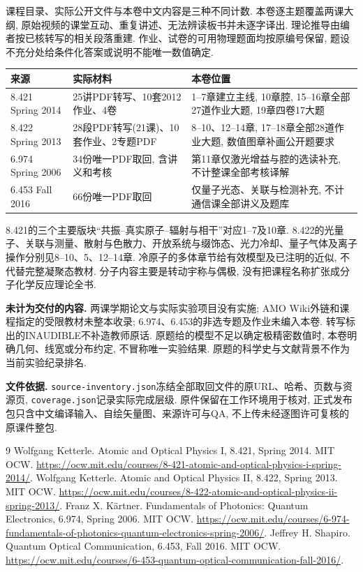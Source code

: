 课程目录、实际公开文件与本卷中文内容是三种不同计数. 本卷逐主题覆盖两课大纲, 原始视频的课堂互动、重复讲述、无法辨读板书并未逐字译出. 理论推导由编者按已核转写的相关段落重建. 作业、试卷的可用物理题面均按原编号保留, 题设不充分处给条件化答案或说明不能唯一数值确定.

\begin{longtable}{p{.22\linewidth}p{.24\linewidth}p{.44\linewidth}}
\toprule 来源 & 实际材料 & 本卷位置\\\midrule\endhead
8.421 Spring 2014 & 25讲PDF转写、10套2012作业、4卷 & 1--7章建立主线, 10章腔, 15--16章全部27道作业大题, 19章四卷17大题\\
8.422 Spring 2013 & 28段PDF转写(21课)、10套作业、2专题PDF & 8--10、12--14章, 17--18章全部28道作业大题, 数值图章补画公开题要求\\
6.974 Spring 2006 & 34份唯一PDF取回, 含讲义和考核 & 第11章仅激光增益与腔的选读补充, 不计整课全部考核译解\\
6.453 Fall 2016 & 66份唯一PDF取回 & 仅量子光态、关联与检测补充, 不计通信课全部讲义及题库\\\bottomrule
\end{longtable}

8.421的三个主要版块“共振--真实原子--辐射与相干”对应1--7及10章. 8.422的光量子、关联与测量、散射与色散力、开放系统与缀饰态、光力冷却、量子气体及离子操作分别见8--10、5、12--14章. 冷原子的多体章节给有效模型及已注明的近似, 不代替完整凝聚态教材. 分子内容主要是转动宇称与偶极, 没有把课程名称扩张成分子化学反应理论全书.



\textbf{未计为交付的内容.} 两课学期论文与实际实验项目没有实施; AMO Wiki外链和课程指定的受限教材未整本收录; 6.974、6.453的非选专题及作业未编入本卷. 转写标出的INAUDIBLE不补造教师原话. 原题给的模型不足以确定极精密数值时, 本卷明确几何、线宽或分布约定, 不冒称唯一实验结果. 原题的科学史与文献背景不作为当前实验纪录排名.

\textbf{文件依据.} \texttt{source-inventory.json}冻结全部取回文件的原URL、哈希、页数与资源页, \texttt{coverage.json}记录实际完成层级. 原件保留在工作环境用于核对, 正式发布包只含中文编译输入、自绘矢量图、来源许可与QA, 不上传未经逐图许可复核的原课件整包.

\begin{thebibliography}{9}
 Wolfgang Ketterle. Atomic and Optical Physics I, 8.421, Spring 2014. MIT OCW. \url{https://ocw.mit.edu/courses/8-421-atomic-and-optical-physics-i-spring-2014/}.
 Wolfgang Ketterle. Atomic and Optical Physics II, 8.422, Spring 2013. MIT OCW. \url{https://ocw.mit.edu/courses/8-422-atomic-and-optical-physics-ii-spring-2013/}.
 Franz X. Kärtner. Fundamentals of Photonics: Quantum Electronics, 6.974, Spring 2006. MIT OCW. \url{https://ocw.mit.edu/courses/6-974-fundamentals-of-photonics-quantum-electronics-spring-2006/}.
 Jeffrey H. Shapiro. Quantum Optical Communication, 6.453, Fall 2016. MIT OCW. \url{https://ocw.mit.edu/courses/6-453-quantum-optical-communication-fall-2016/}.
\end{thebibliography}
